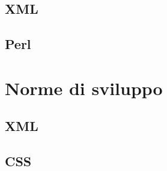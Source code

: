 \documentclass[10pt,a4paper,onecolumn]{article}
\begin{document}
\subsection{XML}

\subsection{Perl}

\clearpage

\section{Norme di sviluppo}

\subsection{XML}


\subsection{CSS}
\end{document}
